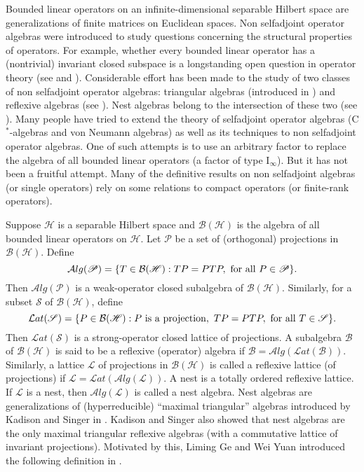 \documentclass[12pt]{article}
\def\H{{\mathscr{H} }}\def\L{{\mathscr{L}}}
\def\P{{\mathscr{P}}}
\def\Lat{{\mathcal Lat}}\def\Alg{{\mathcal Alg}}
\newcommand{\BBB}{\mathcal B}
\def\Lat{\mathcal Lat}
\def\Alg{\mathcal Alg}
\begin{document}
Bounded linear operators on an infinite-dimensional separable
Hilbert space are generalizations of finite matrices on Euclidean
spaces. Non selfadjoint operator algebras were introduced to study
questions concerning the structural properties of operators. For
example, whether every bounded linear operator has a (nontrivial)
invariant closed subspace is a longstanding open question in
operator theory (see \cite{RR} and \cite{Ar}). Considerable effort
has been made to the study of two classes of non selfadjoint
operator algebras: triangular algebras (introduced in \cite{KS}) and
reflexive algebras (see \cite{R}). Nest algebras belong to the
intersection of these two (see \cite{Da}). Many people have tried to
extend the theory of selfadjoint operator algebras
(C$^{\ast}$-algebras and von Neumann algebras) as well as its
techniques to non selfadjoint operator algebras. One of such
attempts is to use an arbitrary factor to replace the algebra of all
bounded linear operators (a factor of type I$_\infty$). But it has
not been a fruitful attempt. Many of the definitive results on non
selfadjoint algebras (or single operators) rely on some relations to
compact operators (or finite-rank operators).\newline



Suppose $\H$ is a separable Hilbert space and $\BBB(\H)$ is the
algebra of all bounded linear operators on $\H$. Let $\P$ be a set
of (orthogonal) projections in $\BBB(\H)$. Define $$\Alg(\P)=\{ T
\in \BBB(\H): TP=PTP, \ {\rm for\ all}\ P\in\P\}.$$ Then $\Alg(\P)$
is a weak-operator closed subalgebra of $\BBB(\H)$. Similarly, for a
subset $\mathscr{S}$ of $\BBB(\H)$, define $$\Lat (\mathscr
S)=\{P\in \BBB(\H): P\ {\rm is\ a \ projection},\ TP=PTP, \ {\rm
for\ all}\ T\in\mathscr{S}\}.$$ Then $\Lat(\mathscr S)$ is a
strong-operator closed lattice of projections. A subalgebra
$\mathscr{B}$ of $\BBB(\H)$ is said to be a reflexive (operator)
algebra if $\mathscr{B}=\Alg(\Lat(\mathscr B))$. Similarly, a
lattice $\L$ of projections in $\BBB(\H)$ is called a reflexive
lattice (of projections) if $\L=\Lat(\Alg(\L))$. A nest is a totally
ordered reflexive lattice. If $\L$ is a nest, then $\Alg(\L)$ is
called a nest algebra. Nest algebras are generalizations of
(hyperreducible) ``maximal triangular'' algebras introduced by
Kadison and Singer in \cite{KS}. Kadison and Singer also showed that
nest algebras are the only maximal triangular reflexive algebras
(with a commutative lattice of invariant projections). Motivated by
this, Liming Ge and Wei Yuan introduced the following definition in
\cite{GY1}.\newline
\end{document}
